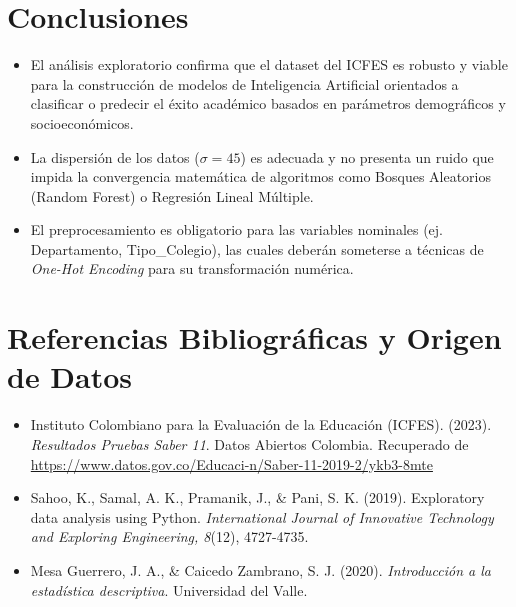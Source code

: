 \documentclass[12pt]{article}
\begin{document}
\section{Conclusiones}
\begin{itemize}
    \item El análisis exploratorio confirma que el dataset del ICFES es robusto y viable para la construcción de modelos de Inteligencia Artificial orientados a clasificar o predecir el éxito académico basados en parámetros demográficos y socioeconómicos.
    \item La dispersión de los datos ($\sigma = 45$) es adecuada y no presenta un ruido que impida la convergencia matemática de algoritmos como Bosques Aleatorios (Random Forest) o Regresión Lineal Múltiple.
    \item El preprocesamiento es obligatorio para las variables nominales (ej. Departamento, Tipo\_Colegio), las cuales deberán someterse a técnicas de \textit{One-Hot Encoding} para su transformación numérica.
\end{itemize}

\newpage
\section{Referencias Bibliográficas y Origen de Datos}
\begin{itemize}
    \item Instituto Colombiano para la Evaluación de la Educación (ICFES). (2023). \textit{Resultados Pruebas Saber 11}. Datos Abiertos Colombia. Recuperado de \url{https://www.datos.gov.co/Educaci-n/Saber-11-2019-2/ykb3-8mte}
    \item Sahoo, K., Samal, A. K., Pramanik, J., \& Pani, S. K. (2019). Exploratory data analysis using Python. \textit{International Journal of Innovative Technology and Exploring Engineering, 8}(12), 4727-4735.
    \item Mesa Guerrero, J. A., \& Caicedo Zambrano, S. J. (2020). \textit{Introducción a la estadística descriptiva}. Universidad del Valle.
\end{itemize}
\end{document}
